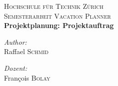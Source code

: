 \begin{titlepage}
 
\begin{center}
 
  
\textsc{\LARGE Hochschule f\"ur Technik Z\"urich}\\[1.5cm]
 
\textsc{\Large Semesterarbeit Vacation Planner}\\[1.5cm]
 { \huge \bfseries Projektplanung: Projektauftrag}\\[5cm]
 \begin{minipage}{0.4\textwidth}
\begin{flushleft} \large
\emph{Author:}\\
Raffael \textsc{Schmid}
\end{flushleft}
\end{minipage}
\begin{minipage}{0.4\textwidth}
\begin{flushright} \large
\emph{Dozent:} \\
Fran\c cois \textsc{Bolay}
\end{flushright}
\end{minipage}
\vfill
\end{center}
\end{titlepage}
